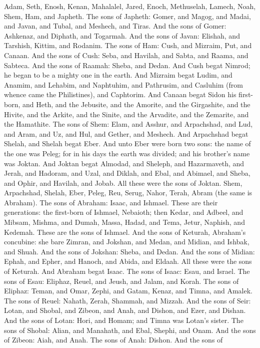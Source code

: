 


Adam, Seth, Enosh, Kenan, Mahalalel, Jared, Enoch, Methuselah, Lamech, Noah, Shem, Ham, and Japheth.  The sons of Japheth: Gomer, and Magog, and Madai, and Javan, and Tubal, and Meshech, and Tiras. And the sons of Gomer: Ashkenaz, and Diphath, and Togarmah. And the sons of Javan: Elishah, and Tarshish, Kittim, and Rodanim.  The sons of Ham: Cush, and Mizraim, Put, and Canaan. And the sons of Cush: Seba, and Havilah, and Sabta, and Raama, and Sabteca. And the sons of Raamah: Sheba, and Dedan. And Cush begat Nimrod; he began to be a mighty one in the earth. And Mizraim begat Ludim, and Anamim, and Lehabim, and Naphtuhim, and Pathrusim, and Casluhim (from whence came the Philistines), and Caphtorim. And Canaan begat Sidon his first-born, and Heth, and the Jebusite, and the Amorite, and the Girgashite, and the Hivite, and the Arkite, and the Sinite, and the Arvadite, and the Zemarite, and the Hamathite.  The sons of Shem: Elam, and Asshur, and Arpachshad, and Lud, and Aram, and Uz, and Hul, and Gether, and Meshech. And Arpachshad begat Shelah, and Shelah begat Eber. And unto Eber were born two sons: the name of the one was Peleg; for in his days the earth was divided; and his brother’s name was Joktan. And Joktan begat Almodad, and Sheleph, and Hazarmaveth, and Jerah, and Hadoram, and Uzal, and Diklah, and Ebal, and Abimael, and Sheba, and Ophir, and Havilah, and Jobab. All these were the sons of Joktan.  Shem, Arpachshad, Shelah, Eber, Peleg, Reu, Serug, Nahor, Terah, Abram (the same is Abraham).  The sons of Abraham: Isaac, and Ishmael. These are their generations: the first-born of Ishmael, Nebaioth; then Kedar, and Adbeel, and Mibsam, Mishma, and Dumah, Massa, Hadad, and Tema, Jetur, Naphish, and Kedemah. These are the sons of Ishmael.  And the sons of Keturah, Abraham’s concubine: she bare Zimran, and Jokshan, and Medan, and Midian, and Ishbak, and Shuah. And the sons of Jokshan: Sheba, and Dedan. And the sons of Midian: Ephah, and Epher, and Hanoch, and Abida, and Eldaah. All these were the sons of Keturah.  And Abraham begat Isaac. The sons of Isaac: Esau, and Israel.  The sons of Esau: Eliphaz, Reuel, and Jeush, and Jalam, and Korah. The sons of Eliphaz: Teman, and Omar, Zephi, and Gatam, Kenaz, and Timna, and Amalek. The sons of Reuel: Nahath, Zerah, Shammah, and Mizzah.  And the sons of Seir: Lotan, and Shobal, and Zibeon, and Anah, and Dishon, and Ezer, and Dishan. And the sons of Lotan: Hori, and Homam; and Timna was Lotan’s sister. The sons of Shobal: Alian, and Manahath, and Ebal, Shephi, and Onam. And the sons of Zibeon: Aiah, and Anah. The sons of Anah: Dishon. And the sons of 